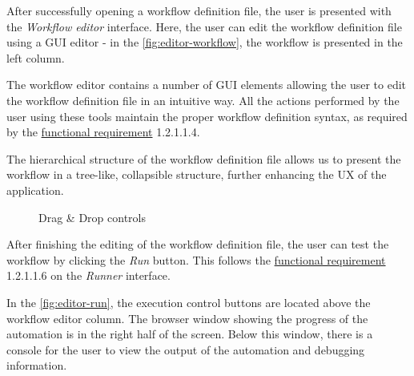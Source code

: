 After successfully opening a workflow definition file, the user is presented with the \textit{Workflow editor} interface. 
Here, the user can edit the workflow definition file using a \ac{GUI} editor - in the \autoref{fig:editor-workflow}, the workflow is presented in the left column.

The workflow editor contains a number of \ac{GUI} elements allowing the user to edit the workflow definition file in an intuitive way.
All the actions performed by the user using these tools maintain the proper workflow definition syntax, as required by the \hyperref[requirements]{functional requirement} 1.2.1.1.4.

The hierarchical structure of the workflow definition file allows us to present the workflow in a tree-like, collapsible structure, further enhancing the \ac{UX} of the application.

\begin{figure}[h!]
    \begin{center}
    \end{center}
    \caption{Drag \& Drop controls}
\end{figure}
\clearpage

After finishing the editing of the workflow definition file, the user can test the workflow by clicking the \textit{Run} button.
This follows the \hyperref[requirements]{functional requirement} 1.2.1.1.6 on the \textit{Runner} interface.

In the \autoref{fig:editor-run}, the execution control buttons are located above the workflow editor column. 
The browser window showing the progress of the automation is in the right half of the screen.
Below this window, there is a console for the user to view the output of the automation and debugging information.

